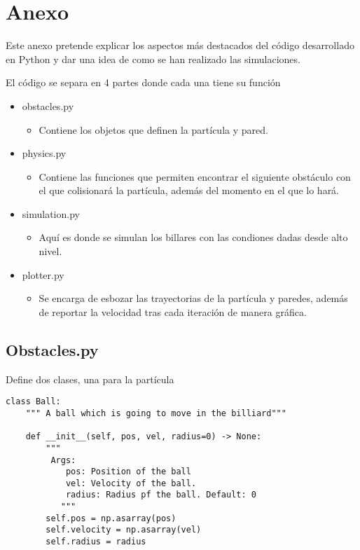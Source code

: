 \chapter*{Anexo}

Este anexo pretende explicar los aspectos más destacados del código desarrollado en Python y dar una idea de como se han realizado las simulaciones.

\vspace{3mm}

El código se separa en 4 partes donde cada una tiene su función

\begin{itemize}
    \item obstacles.py
    \begin{itemize}
        \item Contiene los objetos que definen la partícula y pared.
    \end{itemize}
    \item physics.py
    \begin{itemize}
        \item Contiene las funciones que permiten encontrar el siguiente obstáculo con el que colisionará la partícula, además del momento en el que lo hará.
    \end{itemize}
    \item simulation.py
    \begin{itemize}
        \item Aquí es donde se simulan los billares con las condiones dadas desde alto nivel. 
    \end{itemize}
    \item plotter.py
    \begin{itemize}
        \item Se encarga de esbozar las trayectorias de la partícula y paredes, además de reportar la velocidad tras cada iteración de manera gráfica.
    \end{itemize}
\end{itemize}

\section*{Obstacles.py}

Define dos clases, una para la partícula 

\begin{lstlisting}[breaklines]
    class Ball:
    """ A ball which is going to move in the billiard"""

    def __init__(self, pos, vel, radius=0) -> None:
        """
         Args:
            pos: Position of the ball
            vel: Velocity of the ball.
            radius: Radius pf the ball. Default: 0
           """
        self.pos = np.asarray(pos)
        self.velocity = np.asarray(vel)
        self.radius = radius
\end{lstlisting}

